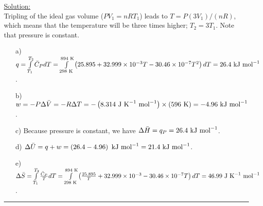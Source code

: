 \noindent
\underline{Solution:}\\

Tripling of the ideal gas volume ($PV_1 = nRT_1$) leads to $T = P(3V_1) / (nR)$, which means that the temperature will be three times higher; $T_2 = 3T_1$. Note that pressure is constant.

\begin{itemize}
\item[a)] $q = \int\limits_{T_1}^{T_2}\bar{C}_PdT = \int\limits_{298\textnormal{ K}}^{894\textnormal{ K}}\left(25.895 + 32.999\times 10^{-3}T - 30.46\times 10^{-7}T^2\right)dT = 26.4\textnormal{ kJ mol}^{-1}$.

\item[b)] $w = -P\Delta\bar{V} = -R\Delta T = -\left(8.314\textnormal{ J K}^{-1}\textnormal{ mol}^{-1}\right)\times\left(596\textnormal{ K}\right) = -4.96\textnormal{ kJ mol}^{-1}$.

\item[c)] Because pressure is constant, we have $\Delta\bar{H} = q_P = 26.4\textnormal{ kJ mol}^{-1}$.

\item[d)] $\Delta\bar{U} = q + w = \left(26.4 - 4.96\right)\textnormal{ kJ mol}^{-1} = 21.4\textnormal{ kJ mol}^{-1}$.

\item[e)] $\Delta\bar{S} = \int\limits_{T_1}^{T_2}\frac{\bar{C}_P}{T}dT = \int\limits_{298\textnormal{ K}}^{894\textnormal{ K}}\left(\frac{25.895}{T} + 32.999\times 10^{-3} - 30.46\times 10^{-7}T\right)dT = 46.99\textnormal{ J K}^{-1}\textnormal{ mol}^{-1}$.

\end{itemize}

\hrule\vspace{0.5cm}
